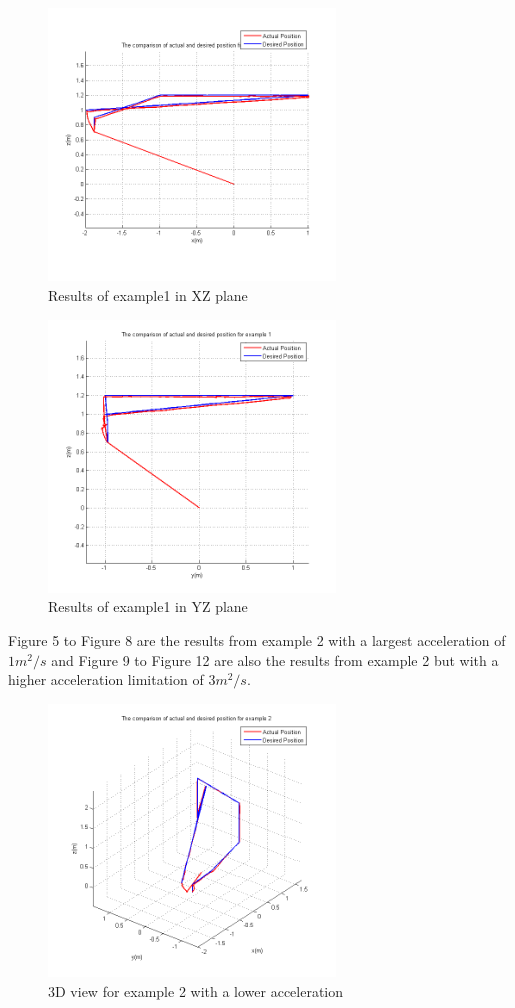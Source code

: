 \begin{figure}[H]
  \centering
  \includegraphics[width=3in]{Ex1_03_XZ.PNG}
  \caption{Results of example1 in XZ plane}
\end{figure}

\begin{figure}[H]
  \centering
  \includegraphics[width=3in]{Ex1_03_YZ.PNG}
  \caption{Results of example1 in YZ plane}
\end{figure}

Figure 5 to Figure 8 are the results from example 2 with a largest acceleration of $1m^2/s$ and Figure 9 to Figure 12 are also the results from example 2 but with a higher acceleration limitation of $3m^2/s$.
\begin{figure}[H]
  \centering
  \includegraphics[width=3in]{Ex2_1_3D.png}
  \caption{3D view for example 2 with a lower acceleration}
\end{figure}

